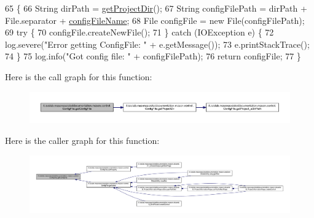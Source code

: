 \begin{DoxyCode}
65                                         \{
66         String dirPath = \hyperlink{classit_1_1isislab_1_1masonassisteddocumentation_1_1mason_1_1control_1_1_config_file_a67bf373e54fb3ce5144d6f4fcbb48bfd}{getProjectDir}();
67         String configFilePath = dirPath + File.separator + \hyperlink{classit_1_1isislab_1_1masonassisteddocumentation_1_1mason_1_1control_1_1_config_file_abcfdfd0e472ce37556509fbe6ec06a10}{configFileName};
68         File configFile = \textcolor{keyword}{new} File(configFilePath);
69         \textcolor{keywordflow}{try} \{
70             configFile.createNewFile();
71         \} \textcolor{keywordflow}{catch} (IOException e) \{
72             log.severe(\textcolor{stringliteral}{"Error getting ConfigFile: "} + e.getMessage());
73             e.printStackTrace();
74         \}
75         log.info(\textcolor{stringliteral}{"Got config file: "} + configFilePath);
76         \textcolor{keywordflow}{return} configFile;
77     \}
\end{DoxyCode}


Here is the call graph for this function\-:\nopagebreak
\begin{figure}[H]
\begin{center}
\leavevmode
\includegraphics[width=350pt]{classit_1_1isislab_1_1masonassisteddocumentation_1_1mason_1_1control_1_1_config_file_af791ff01652e95f6385641909b805e20_cgraph}
\end{center}
\end{figure}




Here is the caller graph for this function\-:
\nopagebreak
\begin{figure}[H]
\begin{center}
\leavevmode
\includegraphics[width=350pt]{classit_1_1isislab_1_1masonassisteddocumentation_1_1mason_1_1control_1_1_config_file_af791ff01652e95f6385641909b805e20_icgraph}
\end{center}
\end{figure}


